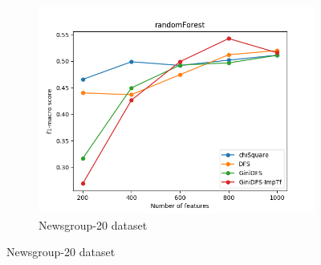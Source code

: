 \documentclass[a4paper, 14pt]{article}
\begin{document}
\begin{justify}
\begin{justify}
\begin{figure}[h!]
\centering
\begin{subfigure}{.5\textwidth}
  \centering
  \includegraphics[width=1.1\linewidth]{pf1_macro_ng_rf.png}
  \caption{Newsgroup-20 dataset}
  \label{fig:sub1}
\end{subfigure}%
\end{figure}
\newpage
\end{justify}

\begin{justify}

\end{justify}


\end{justify}


\newpage
\end{document}
